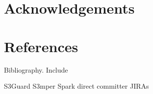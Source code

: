 \documentclass[9pt,technote]{IEEEtran}
\begin{document}
\section{Acknowledgements}

\section{References}

Bibliography. Include

S3Guard
S3mper
Spark direct committer JIRAs
\end{document}
